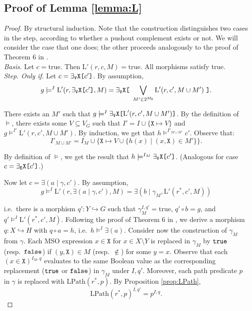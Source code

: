 \documentclass{llncs}
\newcommand{\mt}[1]{\text{\tt{#1}}}
\begin{document}
	
	
	
	
	
	
	
	
	
	
	
	
	\newpage
	\subsection{Proof of Lemma \ref{lemma:L}}\label{lemma:L:PROOF}
	
	\begin{proof}
		By structural induction. Note that the construction distinguishes two cases in the step, according to whether a pushout complement exists or not. We will consider the case that one does; the other proceeds analogously to the proof of Theorem 6 in \cite{Habel-Pennemann09a}.\\
		
		\noindent\emph{Basis.} Let $c = \text{true}$. Then $\text{L}'(r,c,M) = \text{true}$. All morphisms satisfy true.\\
		
		\noindent\emph{Step. Only if.} Let $c = \exists_\mathtt{V}\mathtt{X}\mt{[}c'\mt{]}$. By assumption,
		\[g\models^I \text{L}'(r,\exists_\mathtt{V}\mathtt{X}\mt{[}c'\mt{]},M) = \exists_\mathtt{V}\mathtt{X}\mt{[}\ \bigvee_{M'\in 2^{M_\mathtt{V}}}\text{L}'(r,c',M\cup M')\ \mt{]}.\]
		
		\noindent There exists an $M'$ such that $g\models^I \exists_\mathtt{V}\mathtt{X}\mt{[} \text{L}'(r,c',M\cup M')\mt{]}$. By the definition of $\models$, there exists some $V \subseteq V_G$ such that  $I' = I \cup \{\mathtt{X}\mapsto V\}$ and $g \models^{I'} \text{L}'(r,c',M\cup M')$. By induction, we get that $h \models^{I'_{M\cup M'}} c'$. Observe that: 
		\[I'_{M\cup M'} = I_M \cup \{\mathtt{X}\mapsto V \cup \{h(x) \mid (x,\mathtt{X})\in M'\}\}.\]
		
		\noindent By definition of $\models$, we get the result that $h \models^{I_M} \exists_\mathtt{V}\mathtt{X}\mt{[}c'\mt{]}$. (Analogous for case $c = \exists_\mathtt{E}\mathtt{X}\mt{[}c'\mt{]}$.)
		
		Now let $c = \exists (a\mid \gamma, c')$. By assumption,
		\[g \models^I \text{L}'(r,\exists (a\mid \gamma, c'),M) = \exists(b\mid \gamma_M,\text{L}'(r^*,c',M))\]
		
		\noindent i.e.\ there is a morphism $q'\!:Y\hookrightarrow G$ such that $\gamma_M^{I,q'} = \text{true}$, $q'\circ b = g$, and $q' \models^I \text{L}'(r^*,c',M)$. Following the proof of Theorem 6 in \cite{Habel-Pennemann09a}, we derive a morphism $q\!: X\hookrightarrow H$ with $q \circ a = h$, i.e.\ $h \models^I \exists(a)$. Consider now the construction of $\gamma_M$ from $\gamma$. Each MSO expression $x\in\mathtt{X}$ for $x\in X \setminus Y$ is replaced in $\gamma_M$ by $\tt true$ (resp.\ $\tt false$) if $(y,\mathtt{X})\in M$ (resp.\ $\notin$) for some $y = x$. Observe that each $(x\in\mathtt{X})^{I_M,q}$ evaluates to the same Boolean value as the corresponding replacement ($\tt true$ or $\tt false$) in $\gamma_M$ under $I,q'$. Moreover, each path predicate $p$ in $\gamma$ is replaced with $\text{LPath}(r^*,p)$. By Proposition \ref{prop:LPath},
		\[ \text{LPath}(r^*,p)^{I,q'} = p^{I,q}. \]
		

\end{proof}
\end{document}
